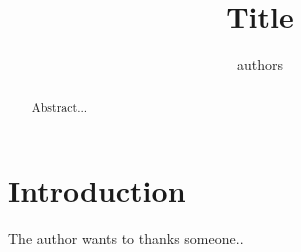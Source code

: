 \documentclass[aps,prd,amsmath,amssymb,showpacs]{revtex4}
\begin{document}
\title{Title}

\author{authors}

\begin{abstract}
  Abstract...
\end{abstract}


\maketitle
\section{Introduction}



\begin{acknowledgments}
  The author wants to thanks someone..
\end{acknowledgments}




\end{document}

